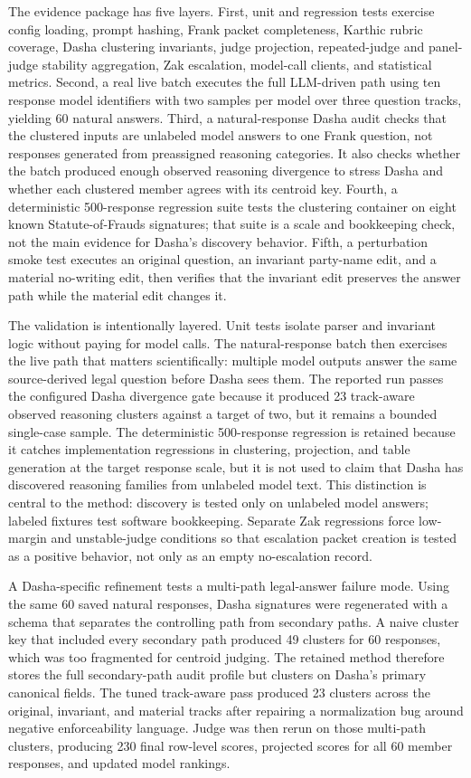 The evidence package has five layers. First, unit and regression tests
exercise config loading, prompt hashing, Frank packet completeness, Karthic
rubric coverage, Dasha clustering invariants, judge projection, repeated-judge
and panel-judge stability aggregation, Zak escalation, model-call clients, and
statistical metrics. Second, a real live batch
executes the full LLM-driven path using ten response model identifiers with two
samples per model over three question tracks, yielding 60 natural answers.
Third, a natural-response Dasha audit
checks that the clustered inputs are unlabeled model answers to one Frank
question, not responses generated from preassigned reasoning categories. It also
checks whether the batch produced enough observed reasoning divergence to stress
Dasha and whether each clustered member agrees with its centroid key. Fourth, a
deterministic 500-response regression suite tests the
clustering container on eight known Statute-of-Frauds signatures; that suite is
a scale and bookkeeping check, not the main evidence for Dasha's discovery
behavior. Fifth, a perturbation smoke test executes an original question,
an invariant party-name edit, and a material no-writing edit, then verifies that
the invariant edit preserves the answer path while the material edit changes it.

The validation is intentionally layered. Unit tests isolate parser and invariant
logic without paying for model calls. The natural-response batch then exercises
the live path that matters scientifically: multiple model outputs answer the
same source-derived legal question before Dasha sees them. The reported run
passes the configured Dasha divergence gate because it produced 23
track-aware observed reasoning clusters against a target of two, but it remains
a bounded single-case sample. The deterministic 500-response regression is retained
because it catches implementation regressions in clustering, projection, and
table generation at the target response scale, but it is not used to claim that
Dasha has discovered reasoning families from unlabeled model text. This
distinction is central to the method: discovery is tested only on unlabeled
model answers; labeled fixtures test software bookkeeping. Separate Zak
regressions force low-margin and unstable-judge conditions so that escalation
packet creation is tested as a positive behavior, not only as an empty
no-escalation record.

A Dasha-specific refinement tests a multi-path legal-answer failure mode.
Using the same 60 saved natural responses, Dasha signatures were regenerated
with a schema that separates the controlling path from secondary paths. A naive
cluster key that included every secondary path produced 49 clusters for 60
responses, which was too fragmented for centroid judging. The retained method
therefore stores the full secondary-path audit profile but clusters on Dasha's
primary canonical fields. The tuned track-aware pass
produced 23 clusters across the original, invariant, and material tracks after
repairing a normalization bug around negative enforceability language. Judge was
then rerun on those multi-path clusters, producing 230 final row-level scores,
projected scores for all 60 member responses, and updated model rankings.

